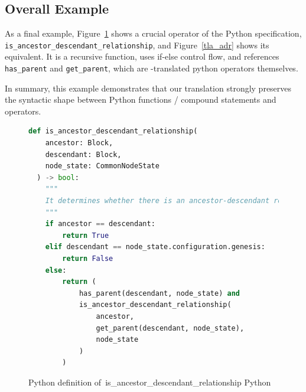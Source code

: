 \subsection{Overall Example}

As a final example, Figure~\ref{py_adr} shows a crucial operator of the Python
specification, \texttt{is\_ancestor\_descendant\_relationship}, and
Figure~\ref{tla_adr} shows its \tlap{} equivalent. It is a recursive function,
uses if-else control flow, and references \texttt{has\_parent} and
\texttt{get\_parent}, which are \tlap{}-translated python operators themselves. 

In summary, this example demonstrates that our translation strongly preserves
the syntactic shape between Python functions / compound statements and \tlap{}
operators.

\begin{figure}

  \begin{lstlisting}[style=mystyle,language=Python]
  def is_ancestor_descendant_relationship(
    ancestor: Block, 
    descendant: Block, 
    node_state: CommonNodeState
  ) -> bool:
    """
    It determines whether there is an ancestor-descendant relationship between two blocks.
    """
    if ancestor == descendant:
        return True
    elif descendant == node_state.configuration.genesis:
        return False
    else:
        return (
            has_parent(descendant, node_state) and
            is_ancestor_descendant_relationship(
                ancestor,
                get_parent(descendant, node_state),
                node_state
            )
        )\end{lstlisting}
  \caption{Python definition
      of~\textsf{is\_ancestor\_descendant\_relationship} Python}\label{py_adr}
\end{figure}

